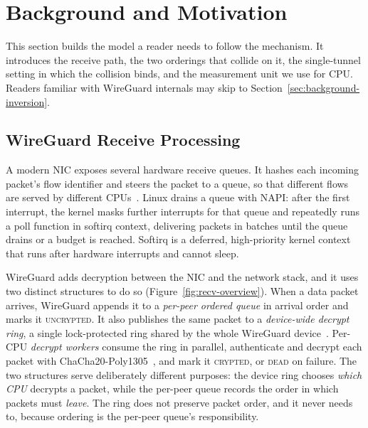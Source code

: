 \section{Background and Motivation}
\label{sec:background}

This section builds the model a reader needs to follow the mechanism. It
introduces the receive path, the two orderings that collide on it, the
single-tunnel setting in which the collision binds, and the measurement unit we
use for CPU. Readers familiar with WireGuard internals may skip to
Section~\ref{sec:background-inversion}.

\subsection{WireGuard Receive Processing}
\label{sec:background-recv}

A modern NIC exposes several hardware receive queues. It hashes each incoming
packet's flow identifier and steers the packet to a queue, so that different
flows are served by different CPUs~\cite{linux-napi,salim2001beyond}. Linux
drains a queue with NAPI: after the first interrupt, the kernel masks further
interrupts for that queue and repeatedly runs a poll function in softirq
context, delivering packets in batches until the queue drains or a budget is
reached. Softirq is a deferred, high-priority kernel context that runs after
hardware interrupts and cannot sleep.

WireGuard adds decryption between the NIC and the network stack, and it uses two
distinct structures to do so (Figure~\ref{fig:recv-overview}). When a data
packet arrives, WireGuard appends it to a \emph{per-peer ordered queue} in
arrival order and marks it \textsc{uncrypted}. It also publishes the same packet
to a \emph{device-wide decrypt ring}, a single lock-protected ring shared by the
whole WireGuard device~\cite{wireguard-linux}. Per-CPU \emph{decrypt workers}
consume the ring in parallel, authenticate and decrypt each packet with
ChaCha20-Poly1305~\cite{rfc8439}, and mark it \textsc{crypted}, or
\textsc{dead} on failure. The two structures serve deliberately different
purposes: the device ring chooses \emph{which CPU} decrypts a packet, while the
per-peer queue records the order in which packets must \emph{leave}. The ring
does not preserve packet order, and it never needs to, because ordering is the
per-peer queue's responsibility.

